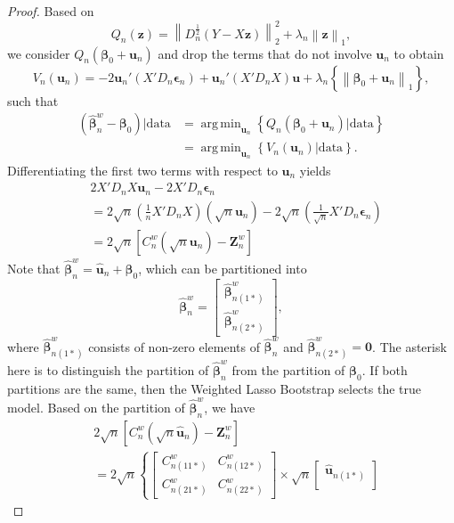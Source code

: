 \documentclass[12pt]{article}
\DeclareMathOperator*{\argmin}{arg\,min} %
\newcommand{\bnw}{\widehat{\bm{\beta}}_n^w} %
\newcommand{\be}{\bm{\beta}} %
\newcommand{\ep}{\bm{\epsilon}} %
\newcommand{\dn}{\frac{1}{n}} %
\newcommand{\dqn}{\frac{1}{\sqrt{n}}} %
\newcommand{\bu}{\bm{u}} %
\newcommand{\cnwas}{C_{n(11*)}^w}
\newcommand{\cnwbs}{C_{n(12*)}^w}
\newcommand{\cnwcs}{C_{n(21*)}^w}
\newcommand{\cnwds}{C_{n(22*)}^w}
\newcommand{\hunas}{\widehat{\bu}_{n(1*)}}
\begin{document}
\begin{proof}
	Based on
	$$
	Q_n(\bm{z}) 
	= \left\| 
			D_n^{\frac{1}{2}} 
			\left( Y - X \bm{z} \right)
	  \right\|_2^2
	  + \lambda_n
	  	\left\| \bm{z} \right\|_1, 
	$$
	we consider $Q_n(\be_0 + \bu_n)$ and drop the terms that do not involve $\bu_n$ to obtain
	$$
	V_n(\bu_n) 
	= - 2 \bu_n' \left(X' D_n \ep_n\right)
	+ \bu_n' \left( X' D_n X \right) \bu 
	+ \lambda_n 
		\left\{  
			\left\| \be_0 + \bu_n \right\|_1 
		\right\},
	$$
	such that
	\begin{align*}
	\left(
		\bnw - \be_0 
	\right) 
	\bigg| \text{data} 
	&= \argmin_{\bu_n}
		\left\{
			Q_n(\be_0 + \bu_n)
			\big| \text{data}
		\right\} \\
	&= \argmin_{\bu_n}
		\left\{
			V_n(\bu_n)
			\big| \text{data}
		\right\}.
	\end{align*}
	Differentiating the first two terms with respect to $\bu_n$ yields
	\begin{align*}
		&2 X' D_n X \bu_n - 2 X' D_n \ep_n \\
		&= 2 \sqrt{n} 
			\left( \dn X' D_n X \right)
			\left( \sqrt{n} \bu_n \right) 
		  - 2 \sqrt{n} 
		  	\left( \dqn X' D_n \ep_n \right) \\
		&= 2 \sqrt{n} 
			\left[
				C_n^w 
				\left( \sqrt{n} \bu_n \right) 
				- \bm{Z}_n^w
			\right] 
	\end{align*}
	Note that $\bnw = \widehat{\bu}_n + \be_0$, which can be partitioned into 
	\[
		\bnw = 
		\begin{bmatrix}
			\widehat{\be}^w_{n(1*)} \\
			\widehat{\be}^w_{n(2*)} 
		\end{bmatrix},
	\]
	where $\widehat{\be}^w_{n(1*)}$ consists of non-zero elements of $\bnw$ and $\widehat{\be}^w_{n(2*)} = \bm{0}$. The asterisk here is to distinguish the partition of $\bnw$ from the partition of $\be_0$. If both partitions are the same, then the Weighted Lasso Bootstrap selects the true model. Based on the partition of $\bnw$, we have      
	\begin{align*}
		&2 \sqrt{n} 
			\left[
				C_n^w 
				\left( \sqrt{n} \widehat{\bu}_n \right) 
				- \bm{Z}_n^w
			\right] \\
		&= 2 \sqrt{n} 
			\left\{
				\begin{bmatrix}
					\cnwas & \cnwbs \\
					\cnwcs & \cnwds 
				\end{bmatrix}
				\times \sqrt{n} 
				\begin{bmatrix}
					\hunas \\

\end{bmatrix}
\end{align*}
\end{proof}
\end{document}
